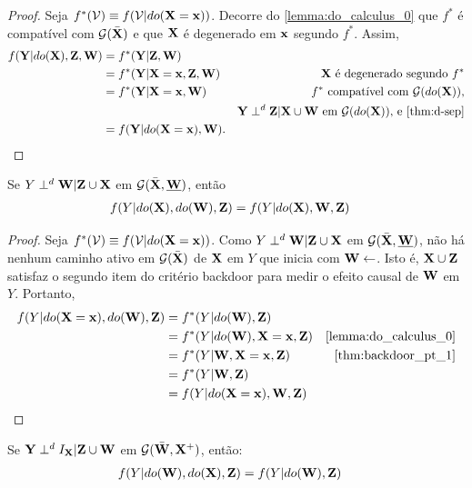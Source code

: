 \begin{proof}
 Seja $f^*({\mathcal V}) \equiv f({\mathcal V}|do({\mathbf{X}}={\mathbf{x}}))$. 
 Decorre do \cref{lemma:do_calculus_0} que
 $f^*$ é compatível com ${\mathcal G}(\bar{{\mathbf{X}}})$ e que
 ${\mathbf{X}}$ é degenerado em ${\mathbf{x}}$ segundo $f^*$.
 Assim,
 \begin{align*}
  f(\Y|do(\X), \Z, \W)
  &= f^*(\Y|\Z, \W) \\
  &= f^*(\Y|\X=\x, \Z, \W)
  & \X \text{ é degenerado segundo }  f^* \\
  &= f^*(\Y|\X=\x, \W)
  & f^* \text{ compatível com } \sG(do(\X)) \text{,} \\
  && \Y \dsep \Z | \X \cup \W \text{ em } \sG(do(\X)) \text{, e \cref{thm:d-sep}} \\
  &= f(\Y|do(\X=\x), \W).
 \end{align*}
\end{proof}

\begin{lemma}
 \label{lemma:do_calculus_2}
 Se $Y \perp^d {\mathbf{W}} | {\mathbf{Z}} \cup {\mathbf{X}}$ em
 ${\mathcal G}(\bar{{\mathbf{X}}}, \underline{{\mathbf{W}}})$, então
 \begin{align*}
  f(Y|do({\mathbf{X}}),do({\mathbf{W}}),{\mathbf{Z}}) &= f(Y|do({\mathbf{X}}),{\mathbf{W}},{\mathbf{Z}})
 \end{align*}
\end{lemma}

\begin{proof}
 Seja $f^*({\mathcal V}) \equiv f({\mathcal V}|do({\mathbf{X}}={\mathbf{x}}))$. 
 Como $Y \perp^d {\mathbf{W}} | {\mathbf{Z}} \cup {\mathbf{X}}$ 
 em ${\mathcal G}(\bar{{\mathbf{X}}}, \underline{{\mathbf{W}}})$, 
 não há nenhum caminho ativo em ${\mathcal G}(\bar{{\mathbf{X}}})$
 de ${\mathbf{X}}$ em $Y$ que inicia com ${\mathbf{W}} \leftarrow$.
 Isto é, ${\mathbf{X}} \cup {\mathbf{Z}}$ satisfaz 
 o segundo item do critério backdoor para
 medir o efeito causal de ${\mathbf{W}}$ em $Y$.
 Portanto,
 \begin{align*}
  f(Y|do(\X=\x),do(\W),\Z)
  &= f^*(Y|do(\W),\Z) \\
  &= f^*(Y|do(\W),\X=\x,\Z)
  & \text{\cref{lemma:do_calculus_0}} \\
  &= f^*(Y|\W,\X=\x,\Z)
  & \text{\cref{thm:backdoor_pt_1}} \\
  &= f^*(Y|\W,\Z) \\
  &= f(Y|do(\X=\x),\W,\Z)
 \end{align*}
\end{proof}

\begin{lemma}
 \label{lemma:do_calculus_3}
 Se ${\mathbf{Y}} \perp^d I_{{\mathbf{X}}} | {\mathbf{Z}} \cup {\mathbf{W}}$ em ${\mathcal G}(\bar{{\mathbf{W}}}, {\mathbf{X}}^{+})$, então:
 \begin{align*}
  f(Y|do({\mathbf{W}}), do({\mathbf{X}}), {\mathbf{Z}}) &= f(Y|do({\mathbf{W}}), {\mathbf{Z}})
 \end{align*}
\end{lemma}

